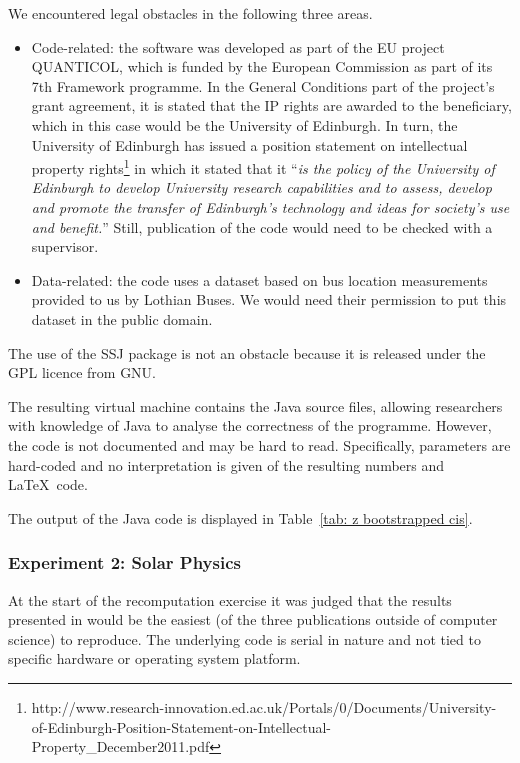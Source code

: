 We encountered legal obstacles in the following three areas.
\begin{itemize} 
\item Code-related: the software was developed as part of the EU project QUANTICOL, which is funded by the European Commission as part of its 7th Framework programme. In the General Conditions part of the project's grant agreement, it is stated that the IP rights are awarded to the beneficiary, which in this case would be the University of Edinburgh. In turn, the University of Edinburgh has issued a position statement on intellectual property rights\footnote{http://www.research-innovation.ed.ac.uk/Portals/0/Documents/University-of-Edinburgh-Position-Statement-on-Intellectual-Property\_December2011.pdf} in which it stated that it ``\emph{is the policy of the University of Edinburgh to develop University research capabilities and to assess, develop and promote the transfer of Edinburgh's technology and ideas for society's use and benefit.}'' Still, publication of the code would need to be checked with a supervisor.
\item Data-related: the code uses a dataset based on bus location measurements provided to us by Lothian Buses. We would need their permission to put this dataset in the public domain.
\end{itemize}
The use of the SSJ package is not an obstacle because it is released under the GPL licence from GNU.

The resulting virtual machine contains the Java source files, allowing researchers with knowledge of Java to analyse the correctness of the programme. However, the code is not documented and may be hard to read. Specifically, parameters are hard-coded and no interpretation is given of the resulting numbers and \LaTeX\ code.

The output of the Java code is displayed in Table~\ref{tab: z bootstrapped cis}.



\subsubsection*{Experiment 2: Solar Physics}

At the start of the recomputation exercise it was judged that the results presented in \cite{bareford2010nanoflare} would be the easiest (of the three publications outside of computer science) to reproduce. The underlying code is serial in nature and not tied to specific hardware or operating system platform. 

